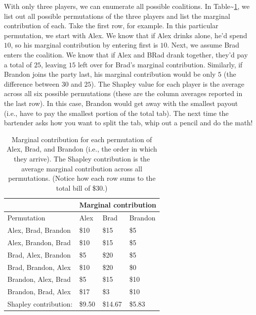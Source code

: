 With only three players, we can enumerate all possible coalitions. In
Table\textasciitilde{}\ref{tab:bar}, we list out all possible
permutations of the three players and list the marginal contribution of
each. Take the first row, for example. In this particular permutation,
we start with Alex. We know that if Alex drinks alone, he'd spend
\(10\), so his marginal contribution by entering first is \(10\). Next,
we assume Brad enters the coalition. We know that if Alex and BRad drank
together, they'd pay a total of \(25\), leaving \(15\) left over for
Brad's marginal contribution. Similarly, if Brandon joins the party
last, his marginal contribution would be only \(5\) (the difference
between \(30\) and \(25\)). The Shapley value for each player is the
average across all six possible permutations (these are the column
averages reported in the last row). In this case, Brandon would get away
with the smallest payout (i.e., have to pay the smallest portion of the
total tab). The next time the bartender asks how you want to split the
tab, whip out a pencil and do the math!

\begin{table}[!htb]
\centering
\begin{tabular}{@{}llll@{}}
\toprule
                      & \multicolumn{3}{l}{Marginal contribution} \\ \midrule
Permutation           & Alex        & Brad         & Brandon      \\ \midrule
Alex, Brad, Brandon   & \$10        & \$15         & \$5          \\ 
Alex, Brandon, Brad   & \$10        & \$15         & \$5          \\
Brad, Alex, Brandon   & \$5         & \$20         & \$5          \\
Brad, Brandon, Alex   & \$10        & \$20         & \$0          \\
Brandon, Alex, Brad   & \$5         & \$15         & \$10         \\
Brandon, Brad, Alex   & \$17        & \$3          & \$10         \\ \midrule
Shapley contribution: & \$9.50      & \$14.67      & \$5.83       \\ \bottomrule
\end{tabular}
\caption{Marginal contribution for each permutation of Alex, Brad, and Brandon (i.e., the order in which they arrive). The Shapley contribution is the average marginal contribution across all permutations. (Notice how each row sums to the total bill of \$30.) \label{tab:bar}}
\end{table}

